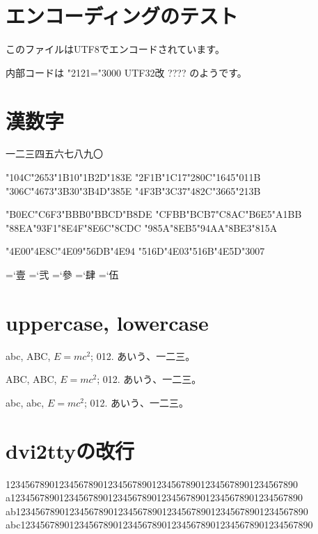 \documentclass{ujarticle}
\begin{document}
\section{エンコーディングのテスト}
このファイルはUTF8でエンコードされています。

内部コードは
\ifnum\jis"2121="3000
 UTF32改%
\else
 ????%
\fi
のようです。


\section{漢数字}

\quad\quad
一二三四五六七八九〇

\char\kuten"104C\char\kuten"2653\char\kuten"1B10\char\kuten"1B2D\char\kuten"183E
\char\kuten"2F1B\char\kuten"1C17\char\kuten"280C\char\kuten"1645\char\kuten"011B
\quad\quad
\char\jis"306C\char\jis"4673\char\jis"3B30\char\jis"3B4D\char\jis"385E
\char\jis"4F3B\char\jis"3C37\char\jis"482C\char\jis"3665\char\jis"213B

\char\euc"B0EC\char\euc"C6F3\char\euc"BBB0\char\euc"BBCD\char\euc"B8DE
\char\euc"CFBB\char\euc"BCB7\char\euc"C8AC\char\euc"B6E5\char\euc"A1BB
\quad\quad
\char\sjis"88EA\char\sjis"93F1\char\sjis"8E4F\char\sjis"8E6C\char\sjis"8CDC
\char\sjis"985A\char\sjis"8EB5\char\sjis"94AA\char\sjis"8BE3\char\sjis"815A

\char\ucs"4E00\char\ucs"4E8C\char\ucs"4E09\char\ucs"56DB\char\ucs"4E94
\char\ucs"516D\char\ucs"4E03\char\ucs"516B\char\ucs"4E5D\char\ucs"3007

=`壹
=`弐
=`參
=`肆
=`伍

\section{uppercase, lowercase}

abc, ABC, $E=mc^2$; 012. あいう、一二三。

\uppercase{abc, ABC, $E=mc^2$; 012. あいう、一二三。}

\lowercase{abc, ABC, $E=mc^2$; 012. あいう、一二三。}

\section{dvi2ttyの改行}
\parindent 0mm

123456789012345678901234567890123456789012345678901234567890\\
a123456789012345678901234567890123456789012345678901234567890\\
ab123456789012345678901234567890123456789012345678901234567890\\
abc123456789012345678901234567890123456789012345678901234567890\\
\end{document}
